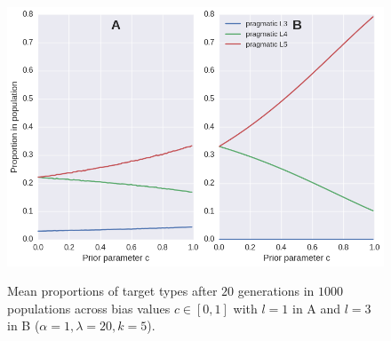 \documentclass[a4paper]{article}
\begin{document}
\begin{figure}
\centering
\includegraphics[scale=.5]{./fig2-rmd}
\label{fig:cost}
\caption{Mean proportions of target types after $20$ generations in $1000$ populations across bias values $c \in [0,1]$ with $l =1$ in A and $l = 3$ in B ($\alpha =1, \lambda = 20, k = 5$).}
\end{figure}
\end{document}

